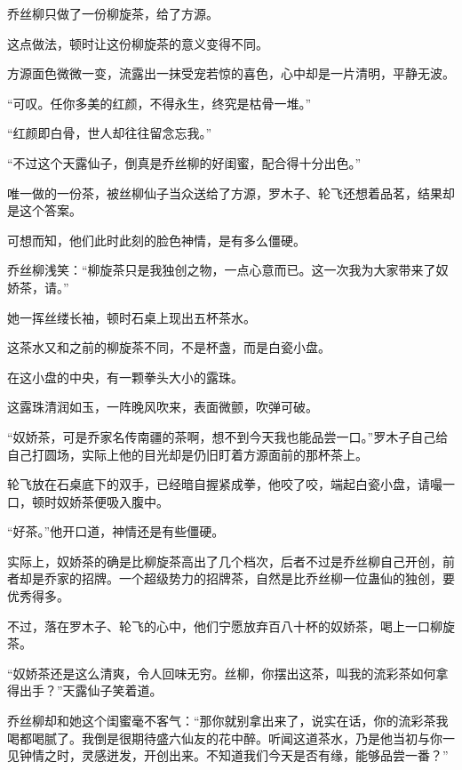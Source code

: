 
\begin{this_body}



乔丝柳只做了一份柳旋茶，给了方源。

这点做法，顿时让这份柳旋茶的意义变得不同。

方源面色微微一变，流露出一抹受宠若惊的喜色，心中却是一片清明，平静无波。

“可叹。任你多美的红颜，不得永生，终究是枯骨一堆。”

“红颜即白骨，世人却往往留念忘我。”

“不过这个天露仙子，倒真是乔丝柳的好闺蜜，配合得十分出色。”

唯一做的一份茶，被丝柳仙子当众送给了方源，罗木子、轮飞还想着品茗，结果却是这个答案。

可想而知，他们此时此刻的脸色神情，是有多么僵硬。

乔丝柳浅笑：“柳旋茶只是我独创之物，一点心意而已。这一次我为大家带来了奴娇茶，请。”

她一挥丝缕长袖，顿时石桌上现出五杯茶水。

这茶水又和之前的柳旋茶不同，不是杯盏，而是白瓷小盘。

在这小盘的中央，有一颗拳头大小的露珠。

这露珠清润如玉，一阵晚风吹来，表面微颤，吹弹可破。

“奴娇茶，可是乔家名传南疆的茶啊，想不到今天我也能品尝一口。”罗木子自己给自己打圆场，实际上他的目光却是仍旧盯着方源面前的那杯茶上。

轮飞放在石桌底下的双手，已经暗自握紧成拳，他咬了咬，端起白瓷小盘，请嘬一口，顿时奴娇茶便吸入腹中。

“好茶。”他开口道，神情还是有些僵硬。

实际上，奴娇茶的确是比柳旋茶高出了几个档次，后者不过是乔丝柳自己开创，前者却是乔家的招牌。一个超级势力的招牌茶，自然是比乔丝柳一位蛊仙的独创，要优秀得多。

不过，落在罗木子、轮飞的心中，他们宁愿放弃百八十杯的奴娇茶，喝上一口柳旋茶。

“奴娇茶还是这么清爽，令人回味无穷。丝柳，你摆出这茶，叫我的流彩茶如何拿得出手？”天露仙子笑着道。

乔丝柳却和她这个闺蜜毫不客气：“那你就别拿出来了，说实在话，你的流彩茶我喝都喝腻了。我倒是很期待盛六仙友的花中醉。听闻这道茶水，乃是他当初与你一见钟情之时，灵感迸发，开创出来。不知道我们今天是否有缘，能够品尝一番？”


\end{this_body}
